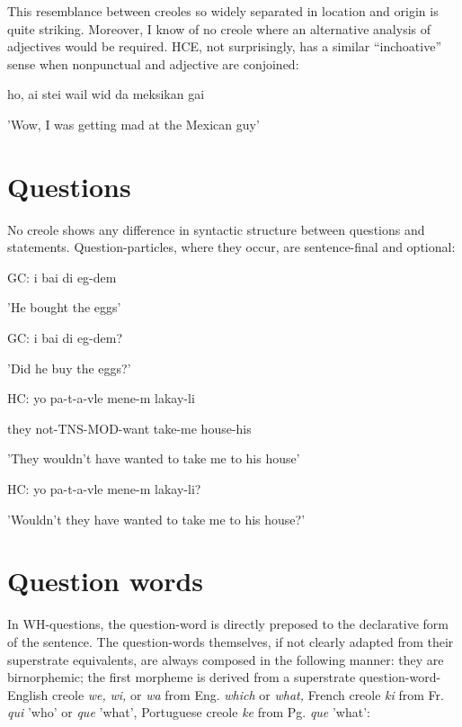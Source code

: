 This resemblance between creoles so widely separated in location and origin is quite striking. Moreover, I know of no creole where an alterna\-tive analysis of adjectives would be required. HCE, not surprisingly, has a similar ``inchoative'' sense when nonpunctual and adjective are conjoined:

\ea\label{ex:74}
 ho, ai stei wail wid da meksikan gai
\glt
\z

'Wow, I was getting mad at the Mexican guy'


\section{Questions}


No creole shows any difference in syntactic structure between questions and statements. Question-particles, where they occur, are sentence-final and optional:

\ea\label{ex:75}
 GC: i bai di eg-dem
\glt
\z

'He bought the eggs'

\ea\label{ex:76}
 GC: i bai di eg-dem?
\glt
\z

'Did he buy the eggs?'

\ea\label{ex:77}
 HC: yo pa-t-a-vle mene-m lakay-li
\glt
\z

they not-TNS-MOD-want take-me house-his

'They wouldn't have wanted to take me to his house'

\ea\label{ex:78}
 HC: yo pa-t-a-vle mene-m lakay-li?
\glt
\z

'Wouldn't they have wanted to take me to his house?'

\section{Question words}

In WH-questions, the question-word is directly preposed to the declarative form of the sentence. The question-words themselves, if not clearly adapted from their superstrate equivalents, are always composed in the following manner: they are birnorphemic; the first morpheme is derived from a superstrate question-word- English creole \textit{we,} \textit{wi,} or \textit{wa} from Eng. \textit{which} or \textit{what,} French creole \textit{ki} from Fr. \textit{qui} 'who' or \textit{que} 'what', Portuguese creole \textit{ke} from Pg. \textit{que} 'what':

